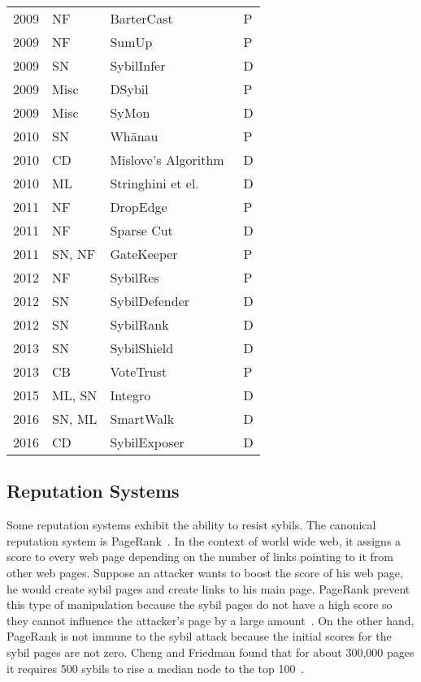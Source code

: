 \begin{table}[]
\begin{tabular}{llll}
  2009 & NF & BarterCast~\cite{meulpolder2009bartercast} & P  \\
  2009 & NF & SumUp~\cite{tran2009sybil} & P  \\
  2009 & SN & SybilInfer~\cite{danezis2009sybilinfer} & D  \\
  2009 & Misc & DSybil~\cite{yu2009dsybil} & P  \\
  2009 & Misc & SyMon~\cite{jyothi2009symon} & D  \\
  2010 & SN & Wh\={a}nau~\cite{lesniewski2010whanau} & P  \\
  2010 & CD & Mislove's Algorithm~\cite{viswanath2010analysis} & D  \\
  2010 & ML & Stringhini et el.~\cite{stringhini2010detecting} & D  \\
  2011 & NF & DropEdge~\cite{seuken2011sybil} & P  \\
  2011 & NF & Sparse Cut~\cite{kurve2011sybil} & D  \\
  2011 & SN, NF & GateKeeper~\cite{tran2011optimal} & P  \\
  2012 & NF & SybilRes~\cite{delaviz2012sybilres} & P  \\
  2012 & SN & SybilDefender~\cite{wei2012sybildefender} & D  \\
  2012 & SN & SybilRank~\cite{cao2012aiding} & D  \\
  2013 & SN & SybilShield~\cite{shi2013sybilshield} & D  \\
  2013 & CB & VoteTrust~\cite{xue2013votetrust} & P  \\
  2015 & ML, SN & Integro~\cite{boshmaf2015integro} & D  \\
  2016 & SN, ML & SmartWalk~\cite{liu2016smartwalk} & D  \\
  2016 & CD & SybilExposer~\cite{misra2016sybilexposer} & D
\end{tabular}
\end{table}

\subsection{Reputation Systems}
Some reputation systems exhibit the ability to resist sybils. The canonical
reputation system is PageRank~\cite{page1999pagerank}. In the context of world
wide web, it assigns a score to every web page depending on the number of links
pointing to it from other web pages. Suppose an attacker wants to boost the
score of his web page, he would create sybil pages and create links to his main
page. PageRank prevent this type of manipulation because the sybil pages do not
have a high score so they cannot influence the attacker's page by a large
amount~\cite{baeza2005pagerank}. On the other hand, PageRank is not immune to
the sybil attack because the initial scores for the sybil pages are not zero.
Cheng and Friedman found that for about 300,000 pages it requires 500 sybils to
rise a median node to the top 100~\cite{cheng2006manipulability}.

